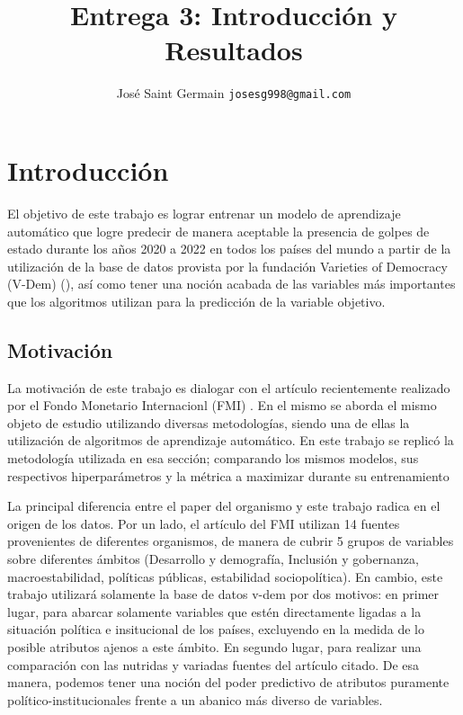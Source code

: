 \documentclass{article}
\title{Entrega 3: Introducción y Resultados}
\author{José Saint Germain \texttt{josesg998@gmail.com} }
\begin{document}
\maketitle

\pagebreak
\tableofcontents
\pagebreak

\section{Introducción}



El objetivo de este trabajo es lograr entrenar un modelo de aprendizaje automático
que logre predecir de manera aceptable la presencia de golpes de estado durante los años 
2020 a 2022 en todos los países del mundo a partir de la utilización de la base de datos 
provista por la fundación Varieties of Democracy (V-Dem) (\cite{Cop24}), 
así como tener una noción acabada de las variables más importantes que los algoritmos 
utilizan para la predicción de la variable objetivo.

\subsection{Motivación}
La motivación de este trabajo es dialogar con el artículo recientemente realizado por el 
Fondo Monetario Internacionl (FMI) \cite{Ceb24}. En el mismo se aborda el mismo objeto 
de estudio utilizando diversas metodologías, siendo una de ellas la utilización de 
algoritmos de aprendizaje automático. En este trabajo se replicó la metodología utilizada 
en esa sección; comparando los mismos modelos, sus respectivos hiperparámetros y la 
métrica a maximizar durante su entrenamiento

La principal diferencia entre el paper del organismo y este trabajo radica en el origen
de los datos. Por un lado, el artículo del FMI utilizan 14 fuentes provenientes de 
diferentes organismos, de manera de cubrir 5 grupos de variables sobre diferentes ámbitos 
(Desarrollo y demografía, Inclusión y gobernanza, macroestabilidad, políticas públicas, 
estabilidad sociopolítica). En cambio, este trabajo utilizará solamente la base de datos 
v-dem por dos motivos: en primer lugar, para abarcar solamente variables que estén 
directamente ligadas a la situación política e insitucional de los países, excluyendo en 
la medida de lo posible atributos ajenos a este ámbito. En segundo lugar, para realizar 
una comparación con las nutridas y variadas fuentes del artículo citado. De esa manera, 
podemos tener una noción del poder predictivo de atributos puramente 
político-institucionales frente a un abanico más diverso de variables.
\end{document}
